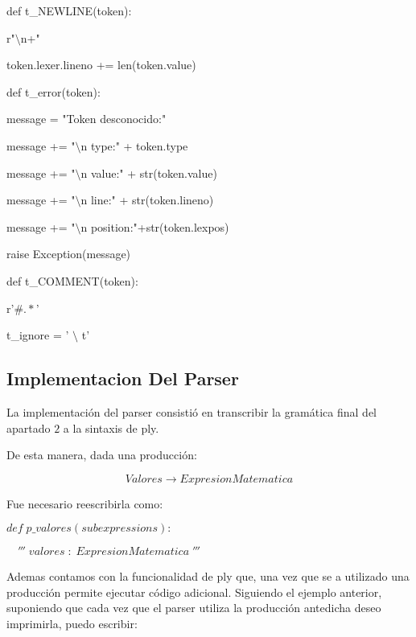\begin{multicols}{2}

def t\_NEWLINE(token):

\hspace{5mm}  r"$\setminus$n+"
  
\hspace{5mm}  token.lexer.lineno += len(token.value)


def t\_error(token):

 \hspace{2mm}message = "Token desconocido:"
    
\hspace{2mm}message += "$\setminus$n type:" + token.type
    
\hspace{2mm}message += "$\setminus$n value:" + str(token.value)
    
\hspace{2mm}message += "$\setminus$n line:" + str(token.lineno)
    
\hspace{2mm}message += "$\setminus$n position:"+str(token.lexpos)
    
\hspace{2mm}raise Exception(message)
  

\columnbreak

def t\_COMMENT(token):

\hspace{2mm}    r'$\#.*$'

t\_ignore  = ' $\setminus$ t'

\end{multicols}

\subsection{Implementacion Del Parser}

La implementación del parser consistió en transcribir la gramática final del apartado $2$ a la sintaxis de ply.

De esta manera, dada una producción:

$$Valores \rightarrow ExpresionMatematica$$

Fue necesario reescribirla como:


$def\; p\_valores(subexpressions):$

$\quad'''\; valores\; :\; ExpresionMatematica\;'''$


Ademas contamos con la funcionalidad de ply que, una vez que se a utilizado una producción permite ejecutar código adicional. Siguiendo el ejemplo anterior, suponiendo que cada vez que el parser utiliza la producción antedicha deseo imprimirla, puedo escribir:
\\


